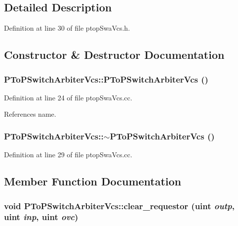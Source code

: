 \subsection{Detailed Description}


Definition at line 30 of file ptopSwaVcs.h.

\subsection{Constructor \& Destructor Documentation}
\subsubsection[{PToPSwitchArbiterVcs}]{\setlength{\rightskip}{0pt plus 5cm}PToPSwitchArbiterVcs::PToPSwitchArbiterVcs ()}\label{classPToPSwitchArbiterVcs_5530a6bc568a9e855ece521371534231}




Definition at line 24 of file ptopSwaVcs.cc.

References name.
\subsubsection[{$\sim$PToPSwitchArbiterVcs}]{\setlength{\rightskip}{0pt plus 5cm}PToPSwitchArbiterVcs::$\sim$PToPSwitchArbiterVcs ()}\label{classPToPSwitchArbiterVcs_a4dfd3e859f494b925f1089d9e201c0b}




Definition at line 29 of file ptopSwaVcs.cc.

\subsection{Member Function Documentation}
\subsubsection[{clear\_\-requestor}]{\setlength{\rightskip}{0pt plus 5cm}void PToPSwitchArbiterVcs::clear\_\-requestor ({\bf uint} {\em outp}, \/  {\bf uint} {\em inp}, \/  {\bf uint} {\em ovc})}\label{classPToPSwitchArbiterVcs_78a137f4c943b0e2fe41ec07cf744d8c}




